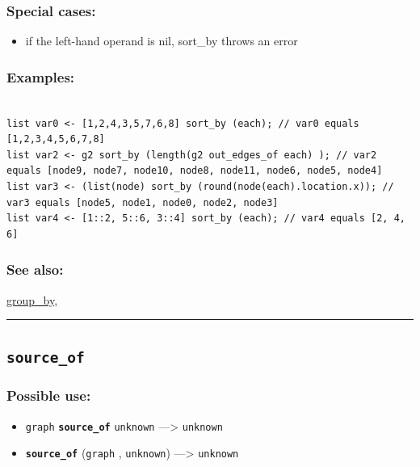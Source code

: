 \documentclass[]{book}
\providecommand{\tightlist}{%
  \setlength{\itemsep}{0pt}\setlength{\parskip}{0pt}}
\theoremstyle{definition}
\theoremstyle{definition}
\theoremstyle{definition}
\theoremstyle{remark}
\begin{document}
\subsubsection{Special cases:}\label{special-cases-124}

\begin{itemize}
\tightlist
\item
  if the left-hand operand is nil, sort\_by throws an error
\end{itemize}

\subsubsection{Examples:}\label{examples-339}

\begin{verbatim}
 
list var0 <- [1,2,4,3,5,7,6,8] sort_by (each); // var0 equals [1,2,3,4,5,6,7,8] 
list var2 <- g2 sort_by (length(g2 out_edges_of each) ); // var2 equals [node9, node7, node10, node8, node11, node6, node5, node4] 
list var3 <- (list(node) sort_by (round(node(each).location.x)); // var3 equals [node5, node1, node0, node2, node3] 
list var4 <- [1::2, 5::6, 3::4] sort_by (each); // var4 equals [2, 4, 6]
\end{verbatim}

\subsubsection{See also:}\label{see-also-188}

\href{operators-d-to-h.html\#group_by}{group\_by},

\begin{center}\rule{0.5\linewidth}{\linethickness}\end{center}

\subsection{\texorpdfstring{\texttt{source\_of}}{source\_of}}\label{source_of}

\subsubsection{Possible use:}\label{possible-use-487}

\begin{itemize}
\tightlist
\item
  \texttt{graph} \textbf{\texttt{source\_of}} \texttt{unknown}
  ---\textgreater{} \texttt{unknown}
\item
  \textbf{\texttt{source\_of}} (\texttt{graph} , \texttt{unknown})
  ---\textgreater{} \texttt{unknown}
\end{itemize}
\end{document}
